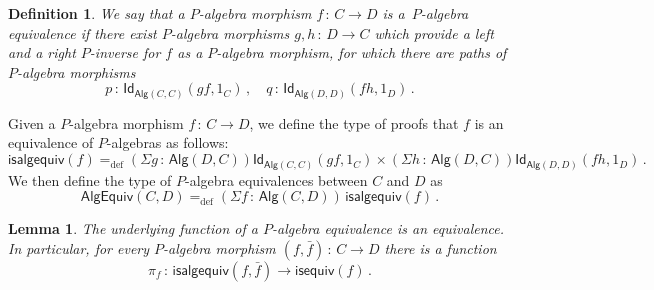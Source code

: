 \documentclass[10pt,a4paper,oneside,reqno]{amsart}
\numberwithin{equation}{section}
\theoremstyle{mythm}
\newtheorem{lemma}[theorem]{Lemma}
\theoremstyle{mydef}
\newtheorem{definition}[theorem]{Definition}
\theoremstyle{myrmk}
\newcommand{\ie}{\text{i.e.\ }}
\newcommand{\defeq}{=_{\mathrm{def}}}
\newcommand{\co}{\,{:}\,}
\newcommand{\Id}{\mathsf{Id}}
\newcommand{\Palg}{\mathsf{Alg}}
\newcommand{\isalgequiv}{\mathsf{isalgequiv}}
\newcommand{\AlgEquiv}{\mathsf{AlgEquiv}}
\begin{document}
\begin{definition}  
We say that a $P$-algebra morphism $f \co C \to D$ is 
 a~\emph{$P$-algebra equivalence}
if there exist $P$-algebra morphisms $g, h \co D \to C$  which provide a left and a right $P$-inverse for $f$ as a
$P$-algebra morphism, \ie for
which there are paths of $P$-algebra morphisms
\[ 
p \co \Id_{\Palg(C,C)}( g  f,  1_C) \, , \quad q \co \Id_{\Palg(D,D)}( f h , 1_D) \, .
\]
\end{definition}
 
Given a $P$-algebra morphism $f \co C \to D$, we define the type of proofs that $f$ is an equivalence of $P$-algebras as follows:
\[
\isalgequiv(f) \defeq  (\Sigma g \co  \Palg(D,C)) \Id_{\Palg(C,C)}( g f, 1_C )  \times 
    (\Sigma h  \co \Palg(D, C)) \Id_{\Palg(D,D)}( f h , 1_D ) \, .
\]
We then define the type of $P$-algebra equivalences between $C$ and $D$ as
\[
\AlgEquiv(C, D)
\defeq   (\Sigma f \co \Palg(C,D)) \, \isalgequiv(f)  \, . 
\] 


\begin{lemma} The underlying function of a $P$-algebra equivalence is an equivalence. In particular, 
for every $P$-algebra morphism $(f, \bar{f}) \co C \to D$ there is a function 
\[
\pi_f \co \isalgequiv(f, \bar{f})  \to \mathsf{isequiv}(f)  \, .
\]
\end{lemma}
\end{document}
